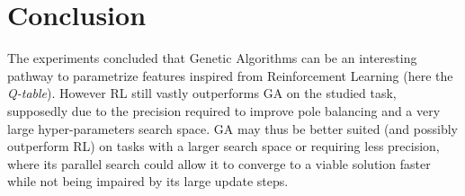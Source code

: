 \section{Conclusion}

The experiments concluded that Genetic Algorithms can be an interesting pathway to parametrize features inspired from Reinforcement Learning (here the \textit{Q-table}).
However RL still vastly outperforms GA on the studied task, supposedly due to the precision required to improve pole balancing and a very large hyper-parameters search space.
GA may thus be better suited (and possibly outperform RL) on tasks with a larger search space or requiring less precision, where its parallel search could allow it to converge to a viable solution faster while not being impaired by its large update steps.


